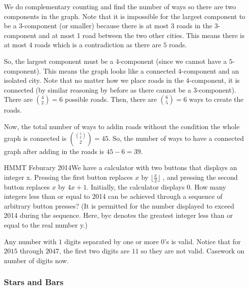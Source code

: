 \documentclass[11pt]{article}
\begin{document}

\begin{sol}
We do complementary counting and find the number of ways so there are two components in the graph. Note that it is impossible for the largest component to be a $3$-component (or smaller) because there is at most 3 roads in the $3$-component and at most 1 road between the two other cities. This means there is at most $4$ roads which is a contradiction as there are $5$ roads.

So, the largest component must be a $4$-component (since we cannot have a $5$-component). This means the graph looks like a connected $4$-component and an isolated city. Note that no matter how we place roads in the $4$-component, it is connected (by similar reasoning by before as there cannot be a 3-component). There are $\binom{4}{2}=6$ possible roads. Then, there are $\binom{6}{5}=6$ ways to create the roads. 

Now, the total number of ways to addin roads without the condition the whole graph is connected is $\binom{\binom{5}{2}}{2}=45$. So, the number of ways to have a connected graph after adding in the roads is $45-6=\boxed{39}$.
\end{sol}

 {HMMT Feburary 2014}{We have a calculator with two buttons that displays an integer x. Pressing the first button replaces
$x$ by $\lfloor \frac{x}{2} \rfloor$ , and pressing the second button replaces $x$ by $4x + 1$. Initially, the calculator displays 0.
How many integers less than or equal to 2014 can be achieved through a sequence of arbitrary button
presses? (It is permitted for the number displayed to exceed 2014 during the sequence. Here, byc
denotes the greatest integer less than or equal to the real number y.)}

\begin{sol}
Any number with $1$ digits separated by one or more $0$'s  is valid. Notice that for $2015$ through $2047$, the first two digits are $11$ so they are not valid. Casework on number of digits now.
\end{sol}

\subsubsection{Stars and Bars}
\end{document}

